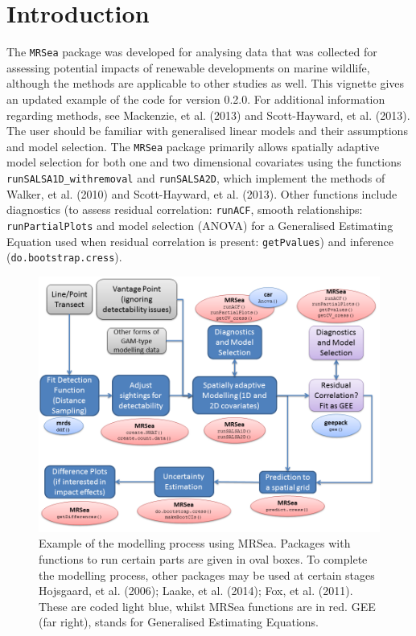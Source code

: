 \documentclass[10pt, a4paper]{article}\usepackage[]{graphicx}\usepackage[]{color}
\makeatletter
\def\maxwidth{ %
  \ifdim\Gin@nat@width>\linewidth
    \linewidth
  \else
    \Gin@nat@width
  \fi
}
\makeatother
\begin{document}
\section{Introduction}
The {\tt MRSea} package was developed for analysing data that was collected for assessing potential impacts of renewable developments on marine wildlife, although the methods are applicable to other studies as well. This vignette gives an updated example of the code for version 0.2.0.  For additional information regarding methods, see Mackenzie, et al. (2013) and Scott-Hayward, et al. (2013).  The user should be familiar with generalised linear models and their assumptions and model selection. The {\tt MRSea} package primarily allows spatially adaptive model selection for both one and two dimensional covariates using the functions {\tt runSALSA1D\_withremoval} and {\tt runSALSA2D}, which implement the methods of Walker, et al. (2010) and Scott-Hayward, et al. (2013). Other functions include diagnostics (to assess residual correlation: {\tt runACF}, smooth relationships: {\tt runPartialPlots} and model selection (ANOVA) for a Generalised Estimating Equation used when residual correlation is present: {\tt getPvalues}) and inference ({\tt do.bootstrap.cress}). 


\begin{figure}[!h]
{\centering \includegraphics[width=0.8\maxwidth]{MRSea_workflow.png} 
\caption{Example of the modelling process using MRSea.  Packages with functions to run certain parts are given in oval boxes.  To complete the modelling process, other packages may be used at certain stages Hojsgaard, et al. (2006); Laake, et al. (2014); Fox, et al. (2011).  These are coded light blue, whilst MRSea functions are in red.  GEE (far right), stands for Generalised Estimating Equations.}
}
\end{figure}
\end{document}
